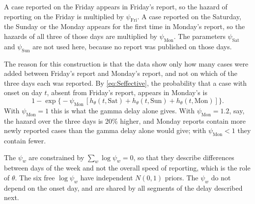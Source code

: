 \documentclass[11pt,a4paper]{article}
\begin{document}
\noindent A case reported on the Friday appears in Friday's report, so the
hazard of reporting on the Friday is multiplied by $\psi_{\text{Fri}}$. A case
reported on the Saturday, the Sunday or the Monday appears for the first time
in Monday's report, so the hazards of all three of those days are multiplied
by $\psi_{\text{Mon}}$. The parameters $\psi_{\text{Sat}}$ and
$\psi_{\text{Sun}}$ are not used here, because no report was published on
those days.

The reason for this construction is that the data show only how many cases
were added between Friday's report and Monday's report, and not on which of
the three days each was reported. By \eqref{eq:Seffective}, the probability
that a case with onset on day $t$, absent from Friday's report, appears in
Monday's is
\begin{equation}\label{eq:example}
1-\exp\bigl\{-\psi_{\text{Mon}}\,
[h_\theta(t,\text{Sat})+h_\theta(t,\text{Sun})+h_\theta(t,\text{Mon})]\bigr\}.
\end{equation}
With $\psi_{\text{Mon}}=1$ this is what the gamma delay alone gives. With
$\psi_{\text{Mon}}=1.2$, say, the hazard over the three days is 20\% higher,
and Monday reports contain more newly reported cases than the gamma delay
alone would give; with $\psi_{\text{Mon}}<1$ they contain fewer.

The $\psi_w$ are constrained by $\sum_w\log\psi_w=0$, so that they describe
differences between days of the week and not the overall speed of reporting,
which is the role of $\theta$. The six free $\log\psi_w$ have independent
$N(0,1)$ priors. The $\psi_w$ do not depend on the onset day, and are shared
by all segments of the delay described next.
\end{document}
